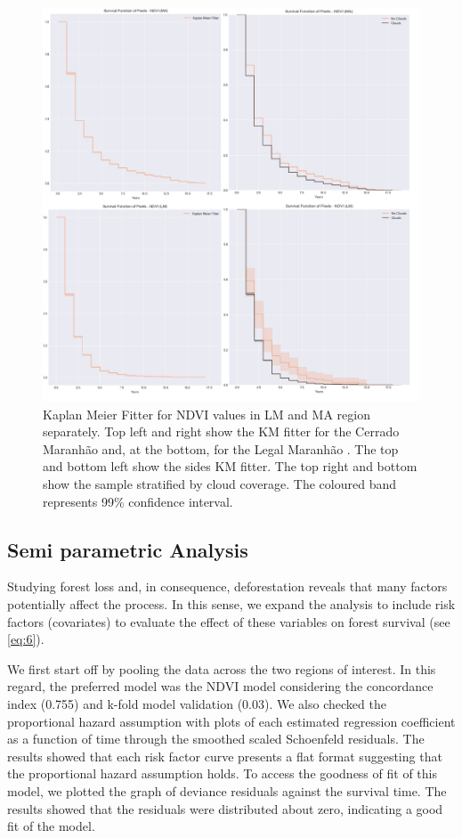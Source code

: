 \begin{figure}[H]
  \centering
  \includegraphics[width=1\textwidth]{KM_NDVI.png}
\caption[Kaplan Meier Fitter for NDVI values in LM and MA region separately.]{Kaplan Meier Fitter for NDVI values in LM and MA region separately. Top left and right show the KM fitter for the Cerrado Maranhão  and, at the bottom, for the Legal Maranhão . The top and bottom left show the sides KM fitter. The top right and bottom show the sample stratified by cloud coverage. The coloured band represents 99\% confidence interval.}
\label{fig:km-ndvi}
\end{figure}


\subsection{Semi parametric Analysis} \label{resultssection2}

Studying forest loss and, in consequence, deforestation reveals that many factors potentially affect the process. In this sense, we expand the analysis to include risk factors (covariates) to evaluate the effect of these variables on forest survival (see \ref{eq:6}). 

We first start off by pooling the data across the two regions of interest.  In this regard, the preferred model was the NDVI model considering the concordance index (0.755) and k-fold model validation (0.03). We also checked the proportional hazard assumption with plots of each estimated regression coefficient as a function of time through the smoothed scaled Schoenfeld residuals. The results showed that each risk factor curve presents a flat format suggesting that the proportional hazard assumption holds. To access the goodness of fit of this model, we plotted the graph of deviance residuals against the survival time. The results showed that the residuals were distributed about zero, indicating a good fit of the model. 

